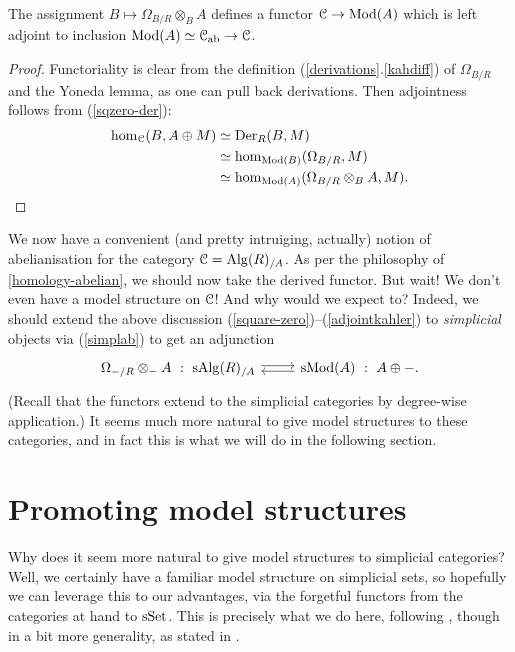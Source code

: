 \begin{proposition}
  \label{adjointkahler}
  The assignment $B \mapsto \Omega_{B/R} \otimes_B A$ defines a
  functor $\mathcal{C} \to \mathrm{Mod}(A)$ which is left adjoint to inclusion $\mathrm{Mod}(A)
  \simeq \mathcal{C}_{\mathrm{ab}} \to \mathcal{C}$.
\end{proposition}

\begin{proof}
  Functoriality is clear from the definition
  (\ref{derivations}.\ref{kahdiff}) of $\Omega_{B/R}$ and the Yoneda
  lemma, as one can pull back derivations. Then adjointness follows
  from (\ref{sqzero-der}):
  \begin{align*}
  \operatorname{hom}_{\mathcal{C}}(B, A \oplus M) &\simeq \operatorname{Der}_R(B,M) \\ &\simeq
  \operatorname{hom}_{\mathrm{Mod}(B)}(\Omega_{B/R}, M) \\ &\simeq
  \operatorname{hom}_{\mathrm{Mod}(A)}(\Omega_{B/R} \otimes_B A, M). \qedhere
  \end{align*}
\end{proof}

\begin{nothing}
  We now have a convenient (and pretty intruiging, actually) notion of
  abelianisation for the category $\mathcal{C} = \mathrm{Alg}(R)_{/A}$. As per the
  philosophy of \textsection \ref{homology-abelian}, we should now
  take the derived functor. But wait! We don't even have a model
  structure on $\mathcal{C}$! And why would we expect to? Indeed, we should
  extend the above discussion
  (\ref{square-zero})--(\ref{adjointkahler}) to \emph{simplicial}
  objects via (\ref{simplab}) to get an adjunction
  \[
  \begin{tikzcd}
    \Omega_{-/R} \otimes_- A \ : \ \s\Alg(R)_{/A} \rar[yshift=2pt] &
    \s\Mod(A) \ :\ A \oplus -. \lar[yshift=-2pt]
  \end{tikzcd}
  \]
  (Recall that the functors extend to the simplicial categories by
  degree-wise application.) It seems much more natural to give model
  structures to these categories, and in fact this is what we will do
  in the following section.
\end{nothing}


\section{Promoting model structures}

Why does it seem more natural to give model structures to simplicial
categories? Well, we certainly have a familiar model structure on
simplicial sets, so hopefully we can leverage this to our advantages,
via the forgetful functors from the categories at hand to
$\mathrm{s}\mathrm{Set}$. This is precisely what we do here, following
\cite{goerssjardine}, though in a bit more generality, as stated in
\cite{goerss-modelsimplicial}.

